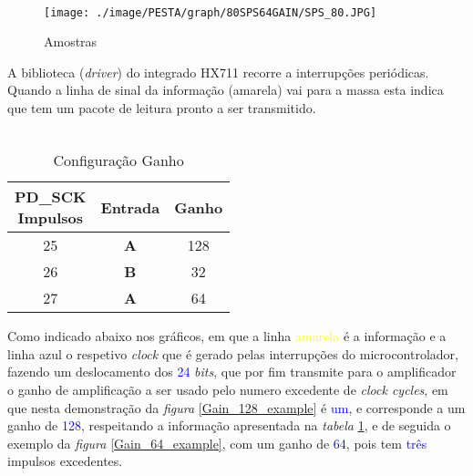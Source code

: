\\
\begin{figure}[H]
	\centering
	\texttt{[image: ./image/PESTA/graph/80SPS64GAIN/SPS\_80.JPG]}
	\caption{Amostras}
	\label{SPS_64}
\end{figure}
A biblioteca (\textit{driver}) do integrado HX711 recorre a interrupções periódicas. Quando a linha de sinal da informação (amarela) vai para a massa esta indica que tem um pacote de leitura pronto a ser transmitido.
\\
\\
\begin{minipage}[!b]{\linewidth}
\begin{minipage}[!b]{.45\linewidth}
	\begin{table}[H]
		\captionsetup{justification=raggedright,singlelinecheck=false}
		\caption{Configuração Ganho}
		\begin{tabular}{ | c | c | c |  }
			\hline
			\makecell[c]{PD\_SCK \\ Impulsos} & Entrada  & Ganho \\
			\hline
			\hline
			25 & \textbf{A} & 128 \\
			\hline
			26 & \textbf{B} & 32 \\
			\hline
			27 & \textbf{A} & 64 \\
			\hline
		\end{tabular}
		\label{Gain_Selection}
	\end{table}
\end{minipage}
\begin{minipage}[l]{.53\linewidth}
\vspace{.1cm}
Como indicado abaixo nos gráficos, em que a linha \textcolor{yellow}{amarela} é a informação e a linha \textcolor{BlueGreen}{azul} o respetivo \textit{clock} que é gerado pelas interrupções do microcontrolador, fazendo um deslocamento dos \textcolor{blue}{24} \textit{bits}, que por fim transmite para o amplificador o ganho de amplificação a ser usado pelo numero excedente de \textit{clock cycles}, em que nesta demonstração da \textit{figura} \ref{Gain_128_example} é \textcolor{blue}{um}, e corresponde a um ganho de \textcolor{blue}{128}, respeitando a informação apresentada na \textit{tabela} \ref{Gain_Selection},  e de seguida o exemplo da \textit{figura} \ref{Gain_64_example}, com um ganho de \textcolor{blue}{64}, pois tem \textcolor{blue}{três} impulsos excedentes.
\end{minipage}
\end{minipage}
